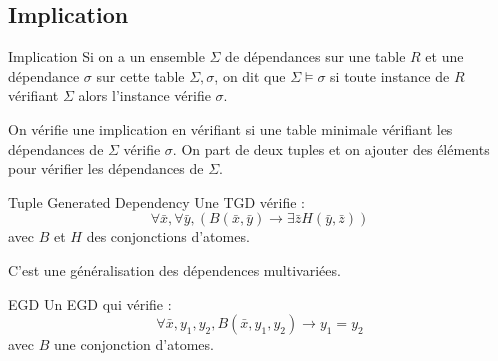 \documentclass{cours}
\begin{document}
\subsection{Implication}
\begin{définition}{Implication}{}
    Si on a un ensemble $\Sigma$ de dépendances sur une table $R$ et une dépendance $\sigma$ sur cette table $\Sigma, \sigma$, on dit que $\Sigma \models \sigma$ si toute instance de $R$ vérifiant $\Sigma$ alors l'instance vérifie $\sigma$. 
\end{définition}

On vérifie une implication en vérifiant si une table minimale vérifiant les dépendances de $\Sigma$ vérifie $\sigma$. On part de deux tuples et on ajouter des éléments pour vérifier les dépendances de $\Sigma$.

\begin{définition}{Tuple Generated Dependency}{}
    Une TGD vérifie : 
    \[
        \forall \bar{x}, \forall \bar{y},  \left(B(\bar{x}, \bar{y}) \rightarrow \exists \bar{z} H(\bar{y}, \bar{z})\right)
    \]
    avec $B$ et $H$ des conjonctions d'atomes.
\end{définition}
C'est une généralisation des dépendences multivariées.

\begin{définition}{EGD}{}
    Un EGD qui vérifie : 
    \[
        \forall \bar{x}, y_{1}, y_{2}, B(\bar{x}, y_{1}, y_{2}) \rightarrow y_{1} = y_{2}
    \]
    avec $B$ une conjonction d'atomes.
\end{définition}
\end{document}
